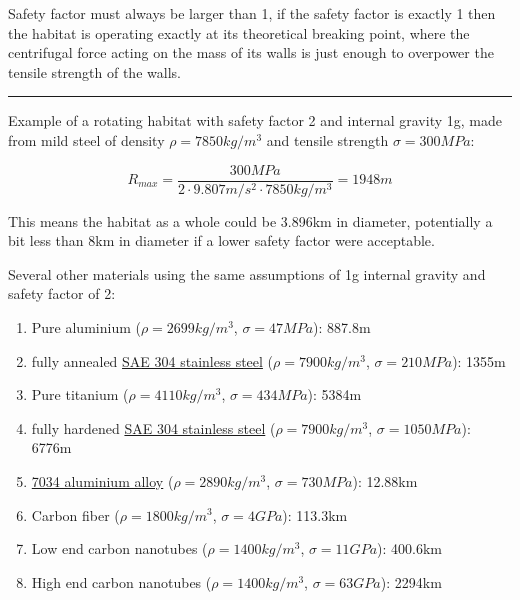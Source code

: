 \documentclass[a4paper]{article}
\begin{document}
	Safety factor must always be larger than 1, if the safety factor is exactly 1 then the habitat is operating exactly at its theoretical breaking point, where the centrifugal force acting on the mass of its walls is just enough to overpower the tensile strength of the walls.
	
	\bigskip
	
	\noindent \rule{\linewidth}{1pt}
	
	\bigskip
	
	Example of a rotating habitat with safety factor 2 and internal gravity 1g, made from mild steel of density $\rho = 7850kg/m^3$ and tensile strength $\sigma = 300MPa$:
	
	$$ R_{max} = \frac{300MPa}{2 \cdot 9.807m/s^2 \cdot 7850kg/m^3} = 1948m $$
	
	This means the habitat as a whole could be 3.896km in diameter, potentially a bit less than 8km in diameter if a lower safety factor were acceptable.
	
	\bigskip
	
	Several other materials using the same assumptions of 1g internal gravity and safety factor of 2:
	
	\begin{enumerate}
		\item Pure aluminium ($\rho = 2699kg/m^3$, $\sigma = 47MPa$): 887.8m
		
		\item fully annealed \href{https://en.wikipedia.org/wiki/SAE_304_stainless_steel#Mechanical_properties}{SAE 304 stainless steel} ($\rho = 7900kg/m^3$, $\sigma = 210MPa$): 1355m
		
		\item Pure titanium ($\rho = 4110kg/m^3$, $\sigma = 434MPa$): 5384m
		
		\item fully hardened \href{https://en.wikipedia.org/wiki/SAE_304_stainless_steel#Mechanical_properties}{SAE 304 stainless steel} ($\rho = 7900kg/m^3$, $\sigma = 1050MPa$): 6776m
		
		\item \href{https://en.wikipedia.org/wiki/7034_aluminium_alloy}{7034 aluminium alloy} ($\rho = 2890kg/m^3$, $\sigma = 730MPa$): 12.88km
		
		\item Carbon fiber ($\rho = 1800kg/m^3$, $\sigma = 4GPa$): 113.3km
		
		\item Low end carbon nanotubes ($\rho = 1400kg/m^3$, $\sigma = 11GPa$): 400.6km
		
		\item High end carbon nanotubes ($\rho = 1400kg/m^3$, $\sigma = 63GPa$): 2294km
	\end{enumerate}
	
\end{document}

